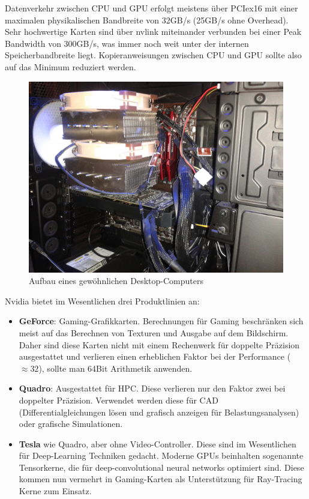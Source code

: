 		Datenverkehr zwischen CPU und GPU erfolgt meistens über \Gls{PCIe}x16 mit einer maximalen physikalischen Bandbreite von 32GB/s (25GB/s ohne Overhead). Sehr hochwertige Karten sind über \gls{nvlink} miteinander verbunden bei einer \Gls{Peak Bandwidth} von 300GB/s, was immer noch weit unter der internen Speicherbandbreite liegt. Kopieranweisungen zwischen CPU und GPU sollte also auf das Minimum reduziert werden.
		
		\begin{figure}[h]
			\centering
    		\includegraphics[height=0.6\textwidth]{chapter2/pictures/pc.jpg}
    		\caption[Desktop PC]{Aufbau eines gew\"ohnlichen Desktop-Computers}
    		\label{2:gpucpu}
		\end{figure}
		
		Nvidia bietet im Wesentlichen drei Produktlinien an:
		\begin{itemize}
		\item \textbf{GeForce}: Gaming-Grafikkarten. Berechnungen für Gaming beschränken sich meist auf das Berechnen von Texturen und Ausgabe auf dem Bildschirm. Daher sind diese Karten nicht mit einem Rechenwerk für doppelte Präzision ausgestattet und verlieren einen erheblichen Faktor bei der Performance ($\approx 32$), sollte man 64Bit Arithmetik anwenden.
		
		\item \textbf{Quadro}: Ausgestattet für HPC. Diese verlieren nur den Faktor zwei bei doppelter Präzision. Verwendet werden diese für CAD (Differentialgleichungen lösen und grafisch anzeigen für Belastungsanalysen) oder grafische Simulationen.
		
		\item \textbf{Tesla} wie Quadro, aber ohne Video-Controller. Diese sind im Wesentlichen für Deep-Learning Techniken gedacht. Moderne GPUs beinhalten sogenannte Tensorkerne, die für deep-convolutional neural networks optimiert sind. Diese kommen nun vermehrt in Gaming-Karten als Unterstützung für Ray-Tracing Kerne zum Einsatz.
		\end{itemize}		 		
		
